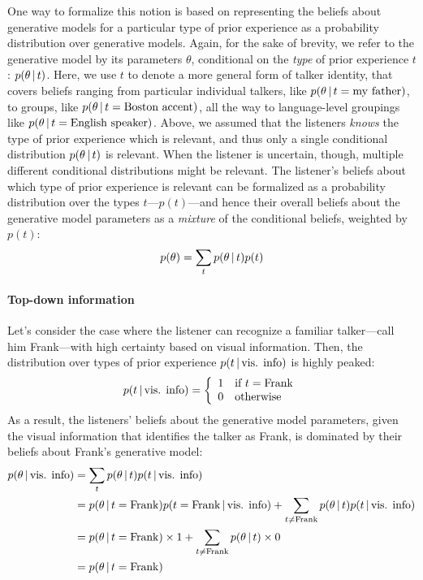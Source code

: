 One way to formalize this notion is based on representing the beliefs about generative models for a particular type of prior experience as a probability distribution over generative models.  Again, for the sake of brevity, we refer to the generative model by its parameters%
 $\theta$, conditional on the \emph{type} of prior experience $t$: $p(\theta\,|\, t)$.  Here, we use $t$ to denote a more general form of talker identity, that covers beliefs ranging from particular individual talkers, like $p(\theta \,|\, t=\mathrm{my\ father})$, to groups, like $p(\theta \,|\, t=\textrm{Boston accent})$, all the way to language-level groupings like $p(\theta \,|\, t=\textrm{English speaker})$.  Above, we assumed that the listeners \emph{knows} the type of prior experience which is relevant, and thus only a single conditional distribution $p(\theta \,|\, t)$ is relevant.  When the listener is uncertain, though, multiple different conditional distributions might be relevant.  The listener's beliefs about which type of prior experience is relevant can be formalized as a probability distribution over the types $t$---$p(t)$---and hence their overall beliefs about the generative model parameters as a \emph{mixture} of the conditional beliefs, weighted by $p(t)$: 
\begin{equation}
  \label{eq:30}
  p(\theta) = \sum_t p(\theta \,|\, t) p(t)
\end{equation}

\paragraph{Top-down information}
\label{sec:top-down-information}

Let's consider the case where the listener can recognize a familiar talker---call him Frank---with high certainty based on visual information.  Then, the distribution over types of prior experience $p(t \,|\, \textrm{vis. info})$ is highly peaked:
\begin{equation}
  \label{eq:31}
  p(t \,|\, \textrm{vis. info}) = \left \{
    \begin{array}{rl}
      1 & \textrm{if } t=\mathrm{Frank} \\
      0 & \mathrm{otherwise}
    \end{array}
  \right .
\end{equation}
As a result, the listeners' beliefs about the generative model parameters, given the visual information that identifies the talker as Frank, is dominated by their beliefs about Frank's generative model: 
\begin{align}
  \label{eq:32}
  p(\theta \,|\, \textrm{vis. info}) &= \sum_t p(\theta \,|\, t) p(t \,|\, \textrm{vis. info}) \\
  &=p(\theta \,|\, t=\mathrm{Frank}) p(t=\mathrm{Frank} \,|\, \textrm{vis. info}) + \sum_{t \ne \mathrm{Frank}} p(\theta \,|\, t) p(t \,|\, \textrm{vis. info}) \\
  &= p(\theta \,|\, t=\mathrm{Frank}) \times 1 + \sum_{t \ne \mathrm{Frank}} p(\theta \,|\, t) \times 0 \\
  &= p(\theta \,|\, t=\mathrm{Frank})
\end{align}

